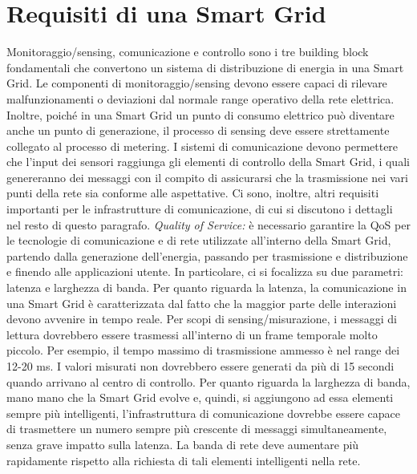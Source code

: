 \section{Requisiti di una Smart Grid}
Monitoraggio/sensing, comunicazione e controllo sono i tre building block fondamentali che convertono un sistema di distribuzione di energia in una Smart Grid. Le componenti di monitoraggio/sensing devono essere capaci di rilevare malfunzionamenti o deviazioni dal normale range operativo della rete elettrica. Inoltre, poiché in una Smart Grid un punto di consumo elettrico può diventare anche un punto di generazione, il processo di sensing deve essere strettamente collegato al processo di metering. \newline
I sistemi di comunicazione devono permettere che l'input dei sensori raggiunga gli elementi di controllo della Smart Grid, i quali genereranno dei messaggi con il compito di assicurarsi che la trasmissione nei vari punti della rete sia conforme alle aspettative. Ci sono, inoltre, altri requisiti importanti per le infrastrutture di comunicazione, di cui si discutono i dettagli nel resto di questo paragrafo.
\newline \newline
\textit{Quality of Service:} è necessario garantire la QoS per le tecnologie di comunicazione e di rete utilizzate all'interno della Smart Grid, partendo dalla generazione dell'energia, passando per trasmissione e distribuzione e finendo alle applicazioni utente. In particolare, ci si focalizza su due parametri: latenza e larghezza di banda.\newline
Per quanto riguarda la latenza, la comunicazione in una Smart Grid è caratterizzata dal fatto che la maggior parte delle interazioni devono avvenire in tempo reale. Per scopi di sensing/misurazione, i messaggi di lettura dovrebbero essere trasmessi all'interno di un frame temporale molto piccolo. Per esempio, il tempo massimo di trasmissione ammesso è nel range dei 12-20 ms. I valori misurati non dovrebbero essere generati da più di 15 secondi quando arrivano al centro di controllo. \newline
Per quanto riguarda la larghezza di banda, mano mano che la Smart Grid evolve e, quindi, si aggiungono ad essa elementi sempre più intelligenti, l'infrastruttura di comunicazione dovrebbe essere capace di trasmettere un numero sempre più crescente di messaggi simultaneamente, senza grave impatto sulla latenza. La banda di rete deve aumentare più rapidamente rispetto alla richiesta di tali elementi intelligenti nella rete.

